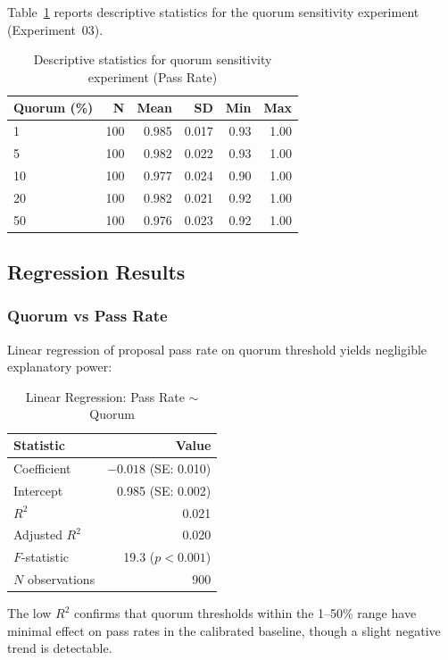 Table~\ref{tab:quorum-descriptive} reports descriptive statistics for the quorum sensitivity experiment (Experiment~03).

\begin{table}[htbp]
\centering
\caption{Descriptive statistics for quorum sensitivity experiment (Pass Rate)}
\label{tab:quorum-descriptive}
\begin{tabular}{lrrrrr}
\toprule
Quorum (\%) & N & Mean & SD & Min & Max \\
\midrule
1 & 100 & 0.985 & 0.017 & 0.93 & 1.00 \\
5 & 100 & 0.982 & 0.022 & 0.93 & 1.00 \\
10 & 100 & 0.977 & 0.024 & 0.90 & 1.00 \\
20 & 100 & 0.982 & 0.021 & 0.92 & 1.00 \\
50 & 100 & 0.976 & 0.023 & 0.92 & 1.00 \\
\bottomrule
\end{tabular}
\end{table}

\subsection{Regression Results}

\subsubsection{Quorum vs Pass Rate}

Linear regression of proposal pass rate on quorum threshold yields negligible explanatory power:

\begin{table}[htbp]
\centering
\caption{Linear Regression: Pass Rate $\sim$ Quorum}
\label{tab:quorum-regression}
\begin{tabular}{lr}
\toprule
Statistic & Value \\
\midrule
Coefficient & $-0.018$ (SE: 0.010) \\
Intercept & 0.985 (SE: 0.002) \\
$R^2$ & 0.021 \\
Adjusted $R^2$ & 0.020 \\
$F$-statistic & 19.3 ($p < 0.001$) \\
$N$ observations & 900 \\
\bottomrule
\end{tabular}
\end{table}

The low $R^2$ confirms that quorum thresholds within the 1--50\% range have minimal effect on pass rates in the calibrated baseline, though a slight negative trend is detectable.

